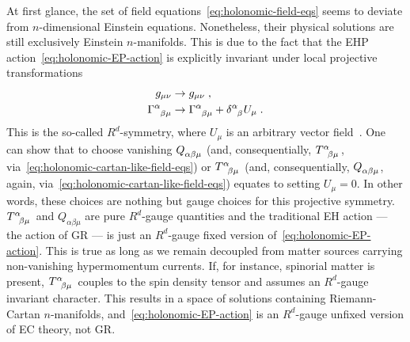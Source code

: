 \documentclass[../../main.tex]{subfiles}
\begin{document}
At first glance, the set of field equations~\eqref{eq:holonomic-field-eqs} seems to deviate from $n$-dimensional Einstein equations. Nonetheless, their physical solutions are still exclusively Einstein $n$-manifolds. This is due to the fact that the EHP action~\eqref{eq:holonomic-EP-action} is explicitly invariant under local projective transformations
\begin{subequations}\label{eq:r-symmetry}
  \begin{align}
    g_{\mu\nu}                          & \rightarrow g_{\mu\nu} \;,                                                              \\
    \tensor{\Gamma}{^\alpha_{\beta\mu}} & \rightarrow \tensor{\Gamma}{^\alpha_{\beta\mu}}+\tensor{\delta}{^\alpha_\beta}U_\mu \;.
  \end{align}
\end{subequations}
This is the so-called $R^d$-symmetry, where $U_\mu$ is an arbitrary vector field~\cite{dadhich2012}. One can show that to choose vanishing $\tensor{Q}{_{\alpha\beta\mu}}$ (and, consequentially, $\tensor{T}{^\alpha_{\beta\mu}}$, via~\eqref{eq:holonomic-cartan-like-field-eqs}) or $\tensor{T}{^\alpha_{\beta\mu}}$ (and, consequentially, $\tensor{Q}{_{\alpha\beta\mu}}$, again, via~\eqref{eq:holonomic-cartan-like-field-eqs}) equates to setting $U_\mu=0$. In other words, these choices are nothing but gauge choices for this projective symmetry. $\tensor{ T }{ ^{ \alpha } _{ \beta \mu } }$ and $ Q_{ \alpha \beta \mu } $ are pure $R^d$-gauge quantities and the traditional EH action --- the action of GR --- is just an $R^d$-gauge fixed version of~\eqref{eq:holonomic-EP-action}. This is true as long as we remain decoupled from matter sources carrying non-vanishing hypermomentum currents. If, for instance, spinorial matter is present, $ \tensor{ T }{ ^{ \alpha } _{ \beta \mu } } $ couples to the spin density tensor and assumes an $R^d$-gauge invariant character. This results in a space of solutions containing Riemann-Cartan $n$-manifolds, and~\eqref{eq:holonomic-EP-action} is an $R^d$-gauge unfixed version of EC theory, not GR\@.
\end{document}
